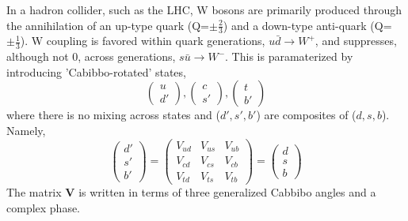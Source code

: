 In a hadron collider, such as the LHC, W bosons are primarily produced
through the annihilation of an up-type quark (Q=$\pm\frac{2}{3}$) and a down-type anti-quark (Q=$\pm\frac{1}{3}$). 
W coupling is favored within quark generations,
$u\bar{d}\rightarrow W^{+}$,
and suppresses, although not 0, across generations, $s\bar{u}\rightarrow W^{-}$.
This is paramaterized by introducing 'Cabibbo-rotated' states, 
\begin{equation}
\left(
    \begin{array}{c}
      u \\
      d' 
    \end{array}
  \right),
  \left(
    \begin{array}{c}
      c \\
      s' 
    \end{array}
  \right),
\left(
    \begin{array}{c}
      t \\
      b' 
    \end{array}
  \right)  
\end{equation}
where there is no mixing across states and ($d',s',b'$) are composites
of ($d,s,b$). Namely,
\begin{equation}
\left(
    \begin{array}{c}
      d' \\
      s'  \\
      b'
    \end{array}
  \right)
  =
  \begin{pmatrix}
  V_{ud} & V_{us} & V_{ub}\\
  V_{cd} & V_{cs} & V_{cb}\\
  V_{td} & V_{ts} & V_{tb}
  \end{pmatrix}
  =
  \left(
    \begin{array}{c}
      d \\
      s  \\
      b
    \end{array}
  \right)
\end{equation}
The matrix {\bf V} is written in terms of three generalized Cabbibo angles and a complex phase.
